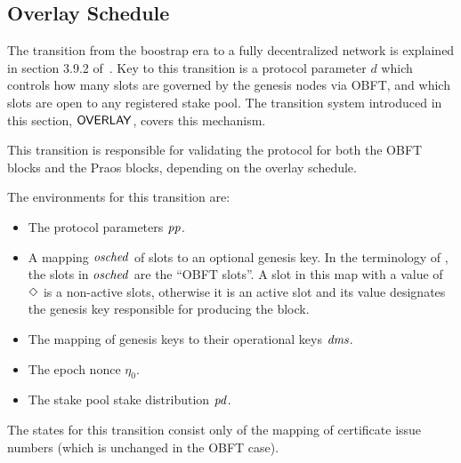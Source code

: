 \clearpage

\subsection{Overlay Schedule}
\label{sec:overlay-schedule}

The transition from the boostrap era to a fully decentralized network is explained in
section 3.9.2 of~\cite{delegation_design}.
Key to this transition is a protocol parameter $d$ which controls how many slots are governed by
the genesis nodes via OBFT, and which slots are open to any registered stake pool.
The transition system introduced in this section, $\mathsf{OVERLAY}$, covers this mechanism.

This transition is responsible for validating the protocol for both the OBFT blocks
and the Praos blocks, depending on the overlay schedule.

The environments for this transition are:
\begin{itemize}
  \item The protocol parameters $\mathit{pp}$.
  \item A mapping $\mathit{osched}$ of slots to an optional genesis key.
    In the terminology of \cite{delegation_design},
    the slots in $\mathit{osched}$ are the ``OBFT slots''.
    A slot in this map with a value of $\Diamond$ is a non-active slots,
    otherwise it is an active slot and its value designates the genesis key
    responsible for producing the block.
  \item The mapping of genesis keys to their operational keys $\mathit{dms}$.
  \item The epoch nonce $\eta_0$.
  \item The stake pool stake distribution $\mathit{pd}$.
\end{itemize}

The states for this transition consist only of the mapping of certificate issue numbers
(which is unchanged in the OBFT case).


